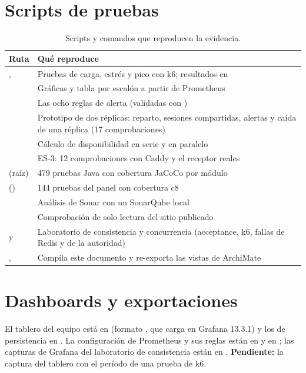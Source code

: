 \section{Scripts de pruebas}
\begin{table}[H]
\centering\small
\caption{Scripts y comandos que reproducen la evidencia.}\label{tab:scripts}
\begin{tabularx}{\textwidth}{lY}
\toprule
\textbf{Ruta} & \textbf{Qué reproduce} \\
\midrule
{},  & Pruebas de carga, estrés y pico con k6; resultados en  \\
 & Gráficas y tabla por escalón a partir de Prometheus \\
 & Las ocho reglas de alerta (validadas con ) \\
 & Prototipo de dos réplicas: reparto, sesiones compartidas, alertas y caída de una réplica (17 comprobaciones) \\
 & Cálculo de disponibilidad en serie y en paralelo \\
 & ES-3: 12 comprobaciones con Caddy y el receptor reales \\
 (raíz) & 479 pruebas Java con cobertura JaCoCo por módulo \\
 () & 144 pruebas del panel con cobertura c8 \\
 & Análisis de Sonar con un SonarQube local \\
 & Comprobación de solo lectura del sitio publicado \\
 y  & Laboratorio de consistencia y concurrencia (acceptance, k6, fallas de Redis y de la autoridad) \\
,  & Compila este documento y re-exporta las vistas de ArchiMate \\
\bottomrule
\end{tabularx}
\end{table}

\section{Dashboards y exportaciones}
El tablero del equipo está en  (formato , que carga en
Grafana 13.3.1) y los de persistencia en . La configuración de Prometheus y sus reglas están en
 y en ; las capturas de Grafana del laboratorio de consistencia están en
. \textbf{Pendiente:} la captura del tablero con el período de una prueba de k6.

